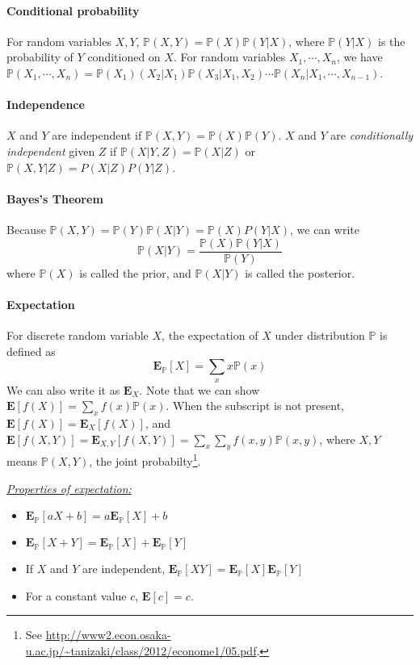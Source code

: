 \documentclass[12pt]{article}
\renewcommand{\P}{\mathbb{P}}
\newcommand{\E}{\bm{E}}
\theoremstyle{definition}
\begin{document}
\paragraph{Conditional probability} For random variables $X, Y$, $\P(X,Y)=\P(X)\P(Y|X)$, where $\P(Y|X)$ is the probability of $Y$ conditioned on $X$. For random variables $X_1,\cdots,X_n$, we have $\P(X_1,\cdots,X_n)=\P(X_1)(X_2|X_1)\P(X_3|X_1,X_2)\cdots\P(X_n|X_1,\cdots,X_{n-1})$.

\paragraph{Independence} $X$ and $Y$ are independent if $\P(X,Y)=\P(X)\P(Y)$. $X$ and $Y$ are \emph{conditionally independent} given $Z$ if $\P(X|Y,Z)=\P(X|Z)$ or $\P(X,Y|Z)=P(X|Z)P(Y|Z)$.

\paragraph{Bayes's Theorem} Because $\P(X,Y)=\P(Y)\P(X|Y)=\P(X)P(Y|X)$, we can write
\begin{equation}
  \P(X|Y) = \frac{\P(X)\P(Y|X)}{\P(Y)}
\end{equation}
where $\P(X)$ is called the prior, and $\P(X|Y)$ is called the posterior.

\paragraph{Expectation} For discrete random variable $X$, the expectation of $X$ under distribution $\P$ is defined as
\begin{equation}
  \E_{\P}[X]=\sum_{x}x\P(x)
\end{equation}
We can also write it as $\E_{X}$. Note that we can show $\E[f(X)]=\sum_{x}f(x)\P(x)$. When the subscript is not present, $\E[f(X)]=\E_{X}[f(X)]$, and $\E[f(X,Y)]=\E_{X,Y}[f(X,Y)]=\sum_{x}\sum_{y}f(x,y)\P(x,y)$, where $X,Y$ means $\P(X,Y)$, the joint probabilty\footnote{See \url{http://www2.econ.osaka-u.ac.jp/~tanizaki/class/2012/econome1/05.pdf}.}.

\underline{\textit{Properties of expectation:}}
\begin{itemize}
  \item $\E_{\P}[aX+b]=a\E_{\P}[X]+b$
  \item $\E_{\P}[X+Y]=\E_{\P}[X]+\E_{\P}[Y]$
  \item If $X$ and $Y$ are independent, $\E_{\P}[XY]=\E_{\P}[X]\E_{\P}[Y]$
  \item For a constant value $c$, $\E[c]=c$.
\end{itemize}
\end{document}
